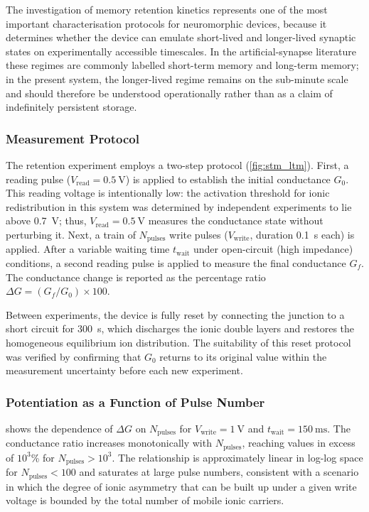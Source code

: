 \documentclass[12pt, a4paper, twoside]{report}
\newcommand{\STM}{short-term memory}
\newcommand{\LTM}{long-term memory}
\begin{document}
The investigation of memory retention kinetics represents one of the most important characterisation protocols for neuromorphic devices, because it determines whether the device can emulate short-lived and longer-lived synaptic states on experimentally accessible timescales. In the artificial-synapse literature these regimes are commonly labelled \STM{} and \LTM{}; in the present system, the longer-lived regime remains on the sub-minute scale and should therefore be understood operationally rather than as a claim of indefinitely persistent storage.

\subsubsection{Measurement Protocol}

The retention experiment employs a two-step protocol (\cref{fig:stm_ltm}). First, a reading pulse ($V_{\mathrm{read}} = \SI{0.5}{\volt}$) is applied to establish the initial conductance $G_0$. This reading voltage is intentionally low: the activation threshold for ionic redistribution in this system was determined by independent experiments to lie above \SI{0.7}{\volt}; thus, $V_{\mathrm{read}} = \SI{0.5}{\volt}$ measures the conductance state without perturbing it. Next, a train of $N_{\mathrm{pulses}}$ write pulses ($V_{\mathrm{write}}$, duration \SI{0.1}{\second} each) is applied. After a variable waiting time $t_{\mathrm{wait}}$ under open-circuit (high impedance) conditions, a second reading pulse is applied to measure the final conductance $G_f$. The conductance change is reported as the percentage ratio $\Delta G = (G_f/G_0) \times 100$.

Between experiments, the device is fully reset by connecting the junction to a short circuit for \SI{300}{\second}, which discharges the ionic double layers and restores the homogeneous equilibrium ion distribution. The suitability of this reset protocol was verified by confirming that $G_0$ returns to its original value within the measurement uncertainty before each new experiment.

\subsubsection{Potentiation as a Function of Pulse Number}

 shows the dependence of $\Delta G$ on $N_{\mathrm{pulses}}$ for $V_{\mathrm{write}} = \SI{1}{\volt}$ and $t_{\mathrm{wait}} = \SI{150}{\milli\second}$. The conductance ratio increases monotonically with $N_{\mathrm{pulses}}$, reaching values in excess of $10^3$\% for $N_{\mathrm{pulses}} > 10^3$. The relationship is approximately linear in log-log space for $N_{\mathrm{pulses}} < 100$ and saturates at large pulse numbers, consistent with a scenario in which the degree of ionic asymmetry that can be built up under a given write voltage is bounded by the total number of mobile ionic carriers.
\end{document}
